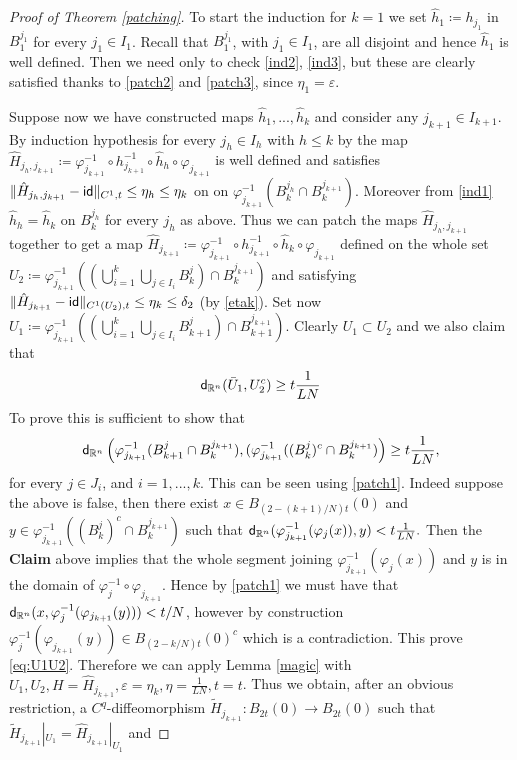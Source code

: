 \documentclass[11pt]{article}
\newcommand{\eps}{\varepsilon}
\newcommand{\rr}{\mathbb{R}}
\newcommand{\sfd}{{\sf d}}
\renewcommand{\phi}{\varphi}
\theoremstyle{plain}
\theoremstyle{definition}
\numberwithin{equation}{section}
\begin{document}
\begin{proof}[Proof of Theorem \ref{patching}]
	To start the induction for $k=1$ we set $\hat h_1\coloneqq h_{j_1}$ in $B_1^{j_1}$ for every $j_1 \in I_1$. Recall that $B_1^{j_1}$, with $j_1 \in I_1$, are all disjoint and hence $\hat h_1$ is well defined. Then we need only to check \eqref{ind2}, \eqref{ind3}, but these are clearly satisfied thanks to \eqref{patch2} and \eqref{patch3}, since $\eta_1=\eps$. 
	
	Suppose now we have constructed maps $\hat h_1,...,\hat h_k$ and consider any $j_{k+1} \in I_{k+1}$. By induction hypothesis for every $j_h \in I_h$ with $h \le k$ by  the map  $\hat H_{j_h,j_{k+1}}\coloneqq \phi_{j_{k+1}}^{-1}\circ h_{j_{k+1}}^{-1}\circ \hat h_{h} \circ \phi_{j_{k+1}}$ is well defined and  satisfies $\| \hat H_{j_h,j_{k+1}}-{\sf{id}}\|_{C^1,t}\le \eta_h\le \eta_k$ on on  $\phi_{j_{k+1}}^{-1}\left(B_{k}^{j_h} \cap B_{k}^{j_{k+1}} \right)$. Moreover from \eqref{ind1} $\hat h_h=\hat h_k$ on $B^{j_h}_k$ for every $j_h$ as above. Thus we can patch the maps $\hat H_{j_h,j_{k+1}}$ together to get a map 
	$\hat H_{j_{k+1}}\coloneqq \phi_{j_{k+1}}^{-1}\circ h_{j_{k+1}}^{-1}\circ \hat h_{k} \circ \phi_{j_{k+1}}$ defined on the whole set $U_2\coloneqq \phi_{j_{k+1}}^{-1}\left((\bigcup_{i=1}^k \bigcup_{j\in I_i} B^j_k)\cap B_k^{j_{k+1}}\right)$ and satisfying $\|\hat H_{j_{k+1}}-{\sf{id}} \|_{C^1(U_2),t}\le \eta_k\le \delta_2$ (by \eqref{etak}). Set now $U_1\coloneqq \phi_{j_{k+1}}^{-1}\left((\bigcup_{i=1}^k \bigcup_{j\in I_i} B^j_{k+1})\cap B_{k+1}^{j_{k+1}}\right)$. Clearly $U_1 \subset U_2$ and we also claim that 
	\begin{equation}\label{eq:U1U2}
		\sfd_{\rr^n}(\bar U_1,U_2^c)\ge t\frac{1}{LN}
	\end{equation} 
To prove this is sufficient to show that $$\sfd_{\rr^n}\left(\phi_{j_{k+1}}^{-1}(B_{k+1}^j\cap B_k^{j_{k+1}}),(\phi_{j_{k+1}}^{-1}((B_{k}^j)^c\cap B_k^{j_{k+1}})\right)\ge t\frac{1}{LN}, 
	$$ 
	for every $j \in J_i$, and $i=1,...,k$. This can be  seen using \eqref{patch1}. Indeed suppose the above is false, then there exist $x \in B_{(2-(k+1)/N)t}(0)$ and $y\in \phi_{j_{k+1}}^{-1}((B_{k}^j)^c\cap B_k^{j_{k+1}})$ such that $\sfd_{\rr^n}(\phi_{j_{k+1}}^{-1}(\phi_j(x)),y)<t\frac{1}{LN}.$ Then the {\bf Claim} above implies that the whole segment joining $\phi_{j_{k+1}}^{-1}(\phi_j(x))$ and $y$ is in the domain of $\phi_j^{-1}\circ \phi_{j_{k+1}}$. Hence by \eqref{patch1} we must have that $\sfd_{\rr^n}(x,\phi_j^{-1}(\phi_{j_{k+1}}(y)))<t/N$, however by construction $\phi_j^{-1}(\phi_{j_{k+1}}(y)) \in B_{(2-k/N)t}(0)^c$ which is a contradiction. This prove \eqref{eq:U1U2}. Therefore we can apply Lemma \ref{magic} with $U_1,U_2, H=\hat H_{j_{k+1}},\eps= \eta_{k},\eta=\frac{1}{LN}, t=t $. Thus we obtain, after an obvious restriction, a $C^q$-diffeomorphism  $\tilde H_{j_{k+1}} : B_{2t}(0)\to B_{2t}(0)$ such that $\tilde H_{j_{k+1}}|_{U_1}=\hat H_{j_{k+1}}|_{U_1}$ and 

\end{proof}
\end{document}
